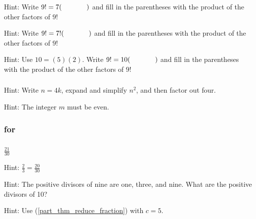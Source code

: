 \subsubsection*{ \answers}
\begin{apart}
    \item Hint: Write $9!=7(\hspace{0.5in})$ and fill in the parentheses with the product of the other factors of $9!$
    \item Hint: Write $9!=7!(\hspace{0.5in})$ and fill in the parentheses with the product of the other factors of $9!$
    \item Hint: Use $10=(5)(2)$. Write $9!=10(\hspace{0.5in})$ and fill in the parentheses with the product of the other factors of $9!$
\end{apart}

\subsubsection*{ \answers}
\begin{apart}
    \item Hint: Write $n=4k$, expand and simplify $n^2$, and then factor out four.
    \item Hint: The integer $m$ must be even.
\end{apart}


\subsubsection{\answers for  \subfractions}

\subsubsection*{ \answers}
\begin{apart}
    \item $\frac{21}{30}$
    \item Hint: $\frac{2}{3}=\frac{20}{30}$
    \item Hint: The positive divisors of nine are one, three, and nine.  What are the positive divisors of 10?
    \item Hint: Use  (\ref{part_thm_reduce_fraction}) with $c=5$.
\end{apart}

